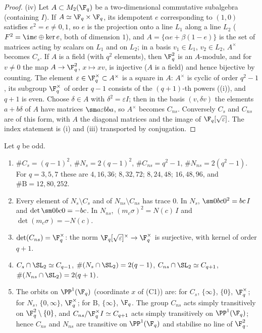 \begin{proof}
(iv) Let $A\subset M_2(\F_q)$ be a two-dimensional commutative subalgebra (containing $I$). If $A\simeq\F_q\times\F_q$, its idempotent $e$ corresponding to $(1,0)$
satisfies $e^2=e\ne0,1$, so $e$ is the projection onto a line $L_1$ along a line $L_2$ ($F^2=\im e\oplus\ker e$, both of dimension $1$), and
$A=\{\alpha e+\beta(1-e)\}$ is the set of matrices acting by scalars on $L_1$ and on $L_2$; in a basis $v_1\in L_1$, $v_2\in L_2$, $A^\times$ becomes $C_s$. If $A$ is a field
(with $q^2$ elements), then $\F_q^2$ is an $A$-module, and for $v\ne0$ the map $A\to\F_q^2$, $x\mapsto xv$, is injective ($A$ is a field) and hence bijective by counting.
The element $\varepsilon\in\F_q^\times\subset A^\times$ is a square in $A$: $A^\times$ is cyclic of order $q^2-1$, its subgroup $\F_q^\times$ of order $q-1$ consists of the
$(q+1)$-th powers ((i)), and $q+1$ is even. Choose $\delta\in A$ with $\delta^2=\varepsilon I$; then in the basis $(v,\delta v)$ the elements $a+b\delta$ of $A$
have matrices $\sm a{\varepsilon b}ba$, so $A^\times$ becomes $C_{ns}$. Conversely $C_s$ and $C_{ns}$ are of this form, with $A$ the diagonal matrices and the image of
$\F_q[\sqrt\varepsilon]$. The index statement is (i) and (iii) transported by conjugation.
\end{proof}

\begin{proposition}\label{prop:groups:cartanfacts}
Let $q$ be odd.
\begin{enumerate}[label=(\roman*)]
\item $\#C_s=(q-1)^2$, $\#N_s=2(q-1)^2$, $\#C_{ns}=q^2-1$, $\#N_{ns}=2(q^2-1)$. For $q=3,5,7$ these are $4,16,36$; $8,32,72$; $8,24,48$; $16,48,96$, and
$\#\mathrm B=12,80,252$.
\item Every element of $N_s\setminus C_s$ and of $N_{ns}\setminus C_{ns}$ has trace $0$. In $N_s$, $\sm0bc0^2=bc\,I$ and $\det\sm0bc0=-bc$. In $N_{ns}$,
$(m_c\sigma)^2=N(c)\,I$ and $\det(m_c\sigma)=-N(c)$.
\item $\det(C_{ns})=\F_q^\times$: the norm $\F_q[\sqrt\varepsilon]^\times\to\F_q^\times$ is surjective, with kernel of order $q+1$.
\item $C_s\cap\SL_2\simeq C_{q-1}$, $\#(N_s\cap\SL_2)=2(q-1)$, $C_{ns}\cap\SL_2\simeq C_{q+1}$, $\#(N_{ns}\cap\SL_2)=2(q+1)$.
\item The orbits on $\PP^1(\F_q)$ (coordinate $x$ of (C1)) are: for $C_s$, $\{\infty\}$, $\{0\}$, $\F_q^\times$; for $N_s$, $\{0,\infty\}$, $\F_q^\times$; for $\mathrm B$, $\{\infty\}$, $\F_q$.
The group $C_{ns}$ acts simply transitively on $\F_q^2\setminus\{0\}$, and $C_{ns}/\F_q^\times I\simeq C_{q+1}$ acts simply transitively on $\PP^1(\F_q)$; hence $C_{ns}$ and $N_{ns}$
are transitive on $\PP^1(\F_q)$ and stabilise no line of $\F_q^2$.
\end{enumerate}
\end{proposition}

